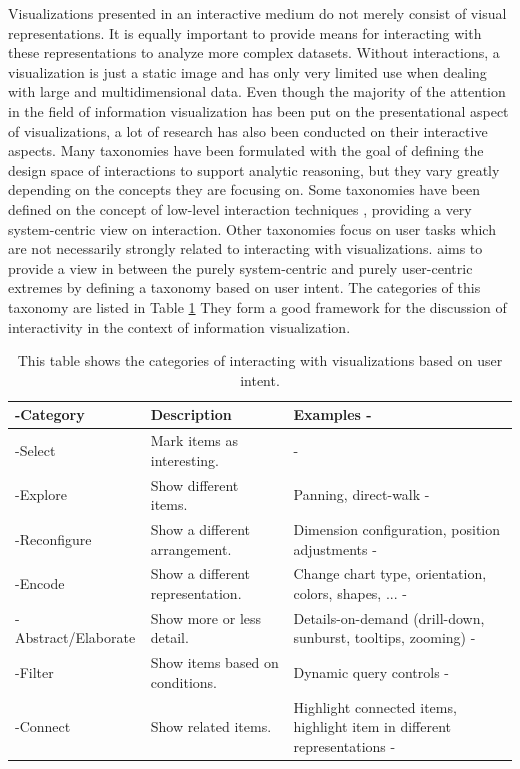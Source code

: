 Visualizations presented in an interactive medium do not merely consist of visual representations.
It is equally important to provide means for interacting with these representations to analyze more complex datasets.
Without interactions, a visualization is just a static image and has only very limited use when dealing with large and multidimensional data.
Even though the majority of the attention in the field of information visualization has been put on the presentational aspect of visualizations, a lot of research has also been conducted on their interactive aspects.
Many taxonomies have been formulated with the goal of defining the design space of interactions to support analytic reasoning, but they vary greatly depending on the concepts they are focusing on.
Some taxonomies have been defined on the concept of low-level interaction techniques \parencite{TheEyesHaveIt,GrammarOfGraphics}, providing a very system-centric view on interaction. 
Other taxonomies focus on user tasks \parencite{LowLevelComponentsOfAnalyticActivity} which are not necessarily strongly related to interacting with visualizations.
\cite{RoleOfInteractionInInformationVisualization} aims to provide a view in between the purely system-centric and purely user-centric extremes by defining a taxonomy based on user intent.
The categories of this taxonomy are listed in Table \ref{tab:UserIntentCategories}
They form a good framework for the discussion of interactivity in the context of information visualization.

\begin{table}[tp]
\tablestretch
{}
\centering
\begin{tabularx}{\linewidth}{>{\kern-\tabcolsep}lXX<{\kern-\tabcolsep}}
\toprule
Category & Description & Examples \\
\midrule
Select & Mark items as interesting. & \\
Explore & Show different items. & Panning, direct-walk \\
Reconfigure & Show a different arrangement. & Dimension configuration, position adjustments \\
Encode & Show a different representation. & Change chart type, orientation, colors, shapes, ... \\
Abstract/Elaborate & Show more or less detail. & Details-on-demand (drill-down, sunburst, tooltips, zooming) \\
Filter & Show items based on conditions. & Dynamic query controls \\
Connect & Show related items. & Highlight connected items, highlight item in different representations \\
\bottomrule
\end{tabularx}
\caption[Categories of Interaction Based on User Intent]{
  This table shows the categories of interacting with visualizations based on user intent.
}
\label{tab:UserIntentCategories}
\end{table}



